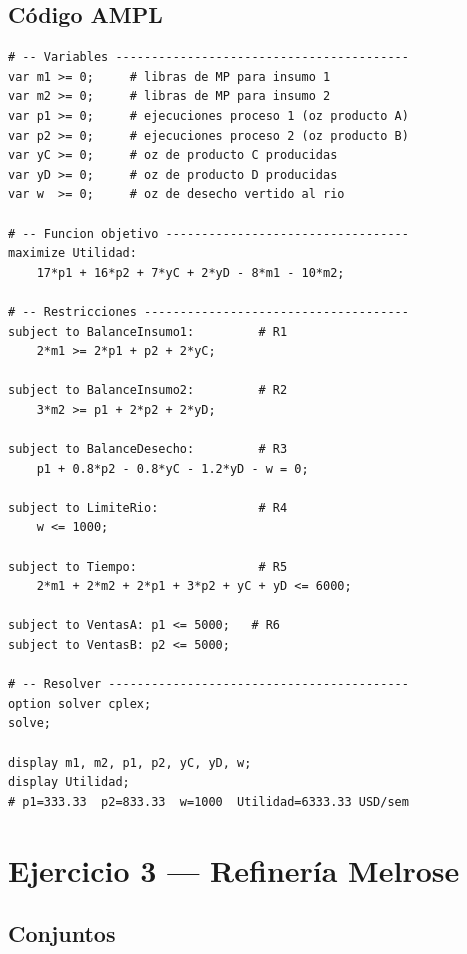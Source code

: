 \documentclass[12pt,a4paper]{article}
\begin{document}
\subsection{Código AMPL}
\begin{lstlisting}[caption={Charcha -- Modelo AMPL}]
# -- Variables -----------------------------------------
var m1 >= 0;     # libras de MP para insumo 1
var m2 >= 0;     # libras de MP para insumo 2
var p1 >= 0;     # ejecuciones proceso 1 (oz producto A)
var p2 >= 0;     # ejecuciones proceso 2 (oz producto B)
var yC >= 0;     # oz de producto C producidas
var yD >= 0;     # oz de producto D producidas
var w  >= 0;     # oz de desecho vertido al rio

# -- Funcion objetivo ----------------------------------
maximize Utilidad:
    17*p1 + 16*p2 + 7*yC + 2*yD - 8*m1 - 10*m2;

# -- Restricciones -------------------------------------
subject to BalanceInsumo1:         # R1
    2*m1 >= 2*p1 + p2 + 2*yC;

subject to BalanceInsumo2:         # R2
    3*m2 >= p1 + 2*p2 + 2*yD;

subject to BalanceDesecho:         # R3
    p1 + 0.8*p2 - 0.8*yC - 1.2*yD - w = 0;

subject to LimiteRio:              # R4
    w <= 1000;

subject to Tiempo:                 # R5
    2*m1 + 2*m2 + 2*p1 + 3*p2 + yC + yD <= 6000;

subject to VentasA: p1 <= 5000;   # R6
subject to VentasB: p2 <= 5000;

# -- Resolver ------------------------------------------
option solver cplex;
solve;

display m1, m2, p1, p2, yC, yD, w;
display Utilidad;
# p1=333.33  p2=833.33  w=1000  Utilidad=6333.33 USD/sem
\end{lstlisting}

\clearpage
\section{Ejercicio 3 — Refinería Melrose}

\subsection{Conjuntos}
\end{document}
